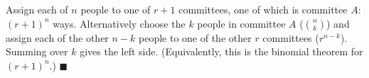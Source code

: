 Assign each of $n$ people to one of $r+1$ committees, one of which is committee $A$: $(r+1)^n$ ways. Alternatively choose the $k$ people in committee $A$ ($\binom nk$) and assign each of the other $n-k$ people to one of the other $r$ committees ($r^{n-k}$). Summing over $k$ gives the left side. (Equivalently, this is the binomial theorem for $(r+1)^n$.) $\blacksquare$
